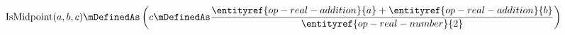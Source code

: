 

\begin{operation}[Midpoint]
\[
\mathrm{IsMidpoint}(a, b, c) \mDefinedAs \left( c \mDefinedAs \frac{\entityref{op-real-addition}{a} + \entityref{op-real-addition}{b}}{\entityref{op-real-number}{2}} \right)
\]
\end{operation}